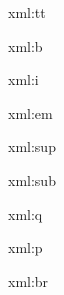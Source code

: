 
\startxmlsetups xml:tt
	{\tt {}}
\stopxmlsetups

\startxmlsetups xml:b
	{\bf {}}
\stopxmlsetups

\startxmlsetups xml:i
	{\it {}}
\stopxmlsetups

\startxmlsetups xml:em
	{\em {}}
\stopxmlsetups

\startxmlsetups xml:sup
\stopxmlsetups

\startxmlsetups xml:sub
\stopxmlsetups

\startxmlsetups xml:q
\stopxmlsetups

\startxmlsetups xml:p
	\par
\stopxmlsetups

\startxmlsetups xml:br
	\crlf
\stopxmlsetups

